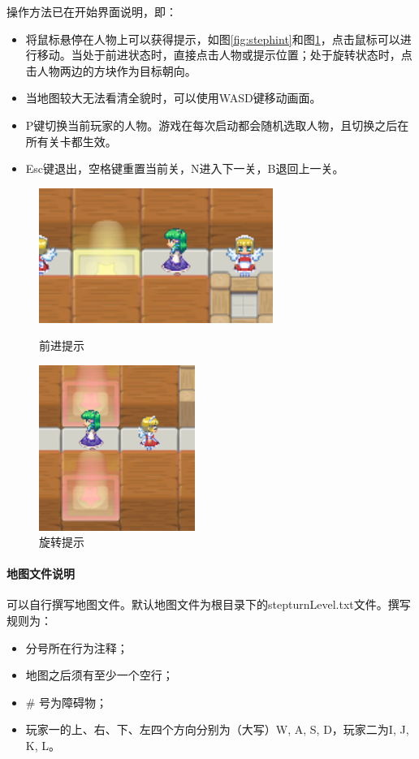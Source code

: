 操作方法已在开始界面说明，即：
\begin{itemize}
	\item 将鼠标悬停在人物上可以获得提示，如图\ref{fig:stephint}和图\ref{fig:turnhint}，点击鼠标可以进行移动。当处于前进状态时，直接点击人物或提示位置；处于旋转状态时，点击人物两边的方块作为目标朝向。
	\item 当地图较大无法看清全貌时，可以使用{\ttfamily WASD}键移动画面。
	\item {\ttfamily P}键切换当前玩家的人物。游戏在每次启动都会随机选取人物，且切换之后在所有关卡都生效。
	\item {\ttfamily Esc}键退出，空格键重置当前关，{\ttfamily N}进入下一关，{\ttfamily B}退回上一关。
\end{itemize}

\begin{figure}[htbp]
\begin{minipage}[t]{0.5\linewidth}
\centering
\includegraphics[width=3in]{pic/stephint.png}
\caption{前进提示}
\label{fig:stephint}
\end{minipage}
\begin{minipage}[t]{0.5\linewidth}
\centering
\includegraphics[width=2in]{pic/turnhint.png}
\caption{旋转提示}
\label{fig:turnhint}
\end{minipage}
\end{figure}

\paragraph{地图文件说明}
可以自行撰写地图文件。默认地图文件为根目录下的{\ttfamily stepturnLevel.txt}文件。撰写规则为：
\begin{itemize}
	\item 分号所在行为注释；
	\item 地图之后须有至少一个空行；
	\item \# 号为障碍物；
	\item 玩家一的上、右、下、左四个方向分别为（大写）{\ttfamily W, A, S, D}，玩家二为{\ttfamily I, J, K, L}。
\end{itemize}

